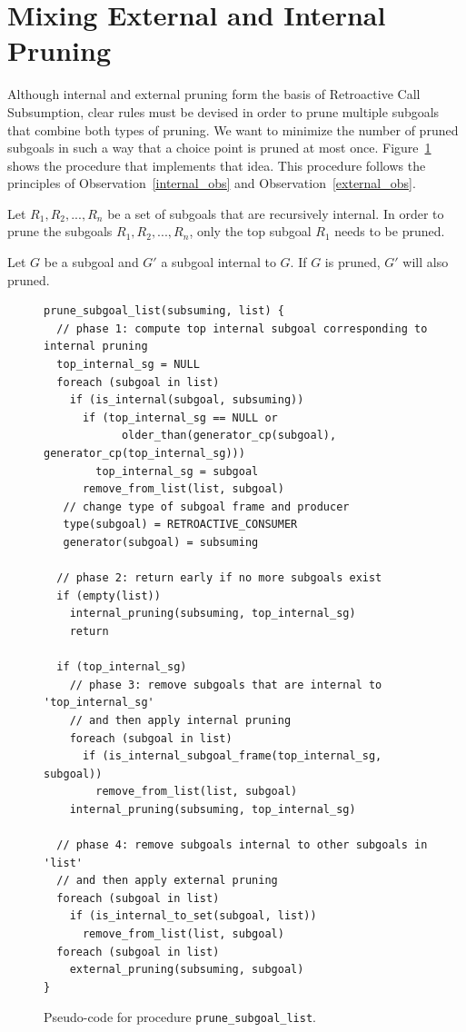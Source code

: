 \section{Mixing External and Internal Pruning}

Although internal and external pruning form the basis of Retroactive Call Subsumption, clear rules must
be devised in order to prune multiple subgoals that combine both types of pruning. We want to
minimize the number of pruned subgoals in such a way that a choice point is pruned at
most once. Figure~\ref{fig:prune_subgoal_list} shows the procedure that implements that idea.
This procedure follows the principles of Observation~\ref{internal_obs} and Observation~\ref{external_obs}.

\begin{samepage}
\begin{pruning_obs}\label{internal_obs}
Let $R_1, R_2, ..., R_n$ be a set of subgoals that are recursively internal. In order to prune the subgoals
$R_1, R_2, ..., R_n$, only the top subgoal $R_1$ needs to be pruned.
\end{pruning_obs}
\end{samepage}
\begin{pruning_obs}\label{external_obs}
Let $G$ be a subgoal and $G'$ a subgoal internal to $G$. If $G$ is pruned, $G'$ will also pruned.
\end{pruning_obs}

\begin{figure}[ht]
\begin{Verbatim}
prune_subgoal_list(subsuming, list) {
  // phase 1: compute top internal subgoal corresponding to internal pruning
  top_internal_sg = NULL
  foreach (subgoal in list)
    if (is_internal(subgoal, subsuming))
      if (top_internal_sg == NULL or
            older_than(generator_cp(subgoal), generator_cp(top_internal_sg)))
        top_internal_sg = subgoal   
      remove_from_list(list, subgoal)
   // change type of subgoal frame and producer
   type(subgoal) = RETROACTIVE_CONSUMER
   generator(subgoal) = subsuming
      
  // phase 2: return early if no more subgoals exist
  if (empty(list))
    internal_pruning(subsuming, top_internal_sg)
    return
  
  if (top_internal_sg)
    // phase 3: remove subgoals that are internal to 'top_internal_sg'
    // and then apply internal pruning
    foreach (subgoal in list)
      if (is_internal_subgoal_frame(top_internal_sg, subgoal))
        remove_from_list(list, subgoal)
    internal_pruning(subsuming, top_internal_sg)
  
  // phase 4: remove subgoals internal to other subgoals in 'list'
  // and then apply external pruning
  foreach (subgoal in list)
    if (is_internal_to_set(subgoal, list))
      remove_from_list(list, subgoal) 
  foreach (subgoal in list)
    external_pruning(subsuming, subgoal)
}
\end{Verbatim}
\caption{Pseudo-code for procedure \texttt{prune\_subgoal\_list}.}
\label{fig:prune_subgoal_list}
\end{figure}

